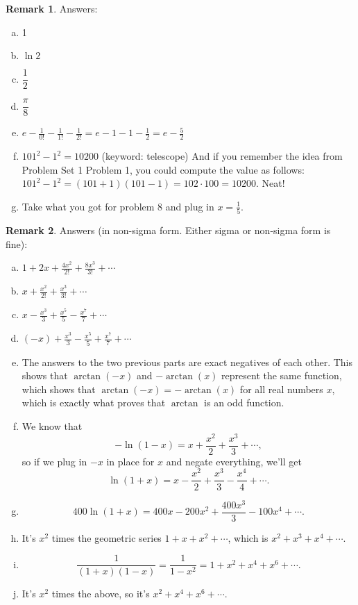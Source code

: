 \documentclass[11pt,oneside]{amsart}
\theoremstyle{definition}
\newtheorem{remark}{Remark}
\begin{document}
\begin{remark}
  Answers:
  \begin{enumerate}[(a)]
    \item 1
    \item $\ln 2$
    \item $\dfrac 12$
    \item $\dfrac{\pi}8$
    \item $\displaystyle e-\frac 1{0!}-\frac{1}{1!}-\frac{1}{2!}=e-1-1-\frac 12=e-\frac52$
    \item $101^2-1^2=10200$ (keyword: telescope)
    And if you remember the idea from Problem Set 1 Problem 1, you could compute the value as follows: $101^2-1^2=(101+1)(101-1)=102\cdot 100=10200$. Neat!
    \item Take what you got for problem 8 and plug in $x=\frac 15$.
  \end{enumerate}
\end{remark}

\begin{remark}
  Answers (in non-sigma form. Either sigma or non-sigma form is fine):
  \begin{enumerate}[(a)]
    \item $\displaystyle 1+2x+\frac{4x^2}{2!}+\frac{8x^3}{3!}+\cdots$
    \item $\displaystyle x+\frac{x^2}{2!}+\frac{x^3}{3!}+\cdots$
    \item $\displaystyle x-\frac{x^3}3+\frac{x^5}5-\frac{x^7}7+\cdots$
    \item $\displaystyle (-x)+\frac{x^3}3-\frac{x^5}5+\frac{x^7}7+\cdots$
    \item The answers to the two previous parts are exact negatives of each other. This shows that $\arctan(-x)$ and $-\arctan(x)$ represent the same function, which shows that $\arctan(-x)=-\arctan(x)$ for all real numbers $x$, which is exactly what proves that $\arctan$ is an odd function.
    \item We know that
    \[-\ln(1-x)=x+\frac{x^2}2+\frac{x^3}3+\cdots,\]
    so if we plug in $-x$ in place for $x$ and negate everything, we'll get
    \[\ln(1+x)=x-\frac{x^2}2+\frac{x^3}3-\frac{x^4}4+\cdots.\]
    \item \[400\ln(1+x)=400x-200x^2+\frac{400x^3}3-100x^4+\cdots.\]
    \item It's $x^2$ times the geometric series $1+x+x^2+\cdots$, which is $x^2+x^3+x^4+\cdots$.
    \item \[\frac 1{(1+x)(1-x)}=\frac 1{1-x^2}=1+x^2+x^4+x^6+\cdots.\]
    \item It's $x^2$ times the above, so it's $x^2+x^4+x^6+\cdots$.
  \end{enumerate}
\end{remark}
\end{document}
